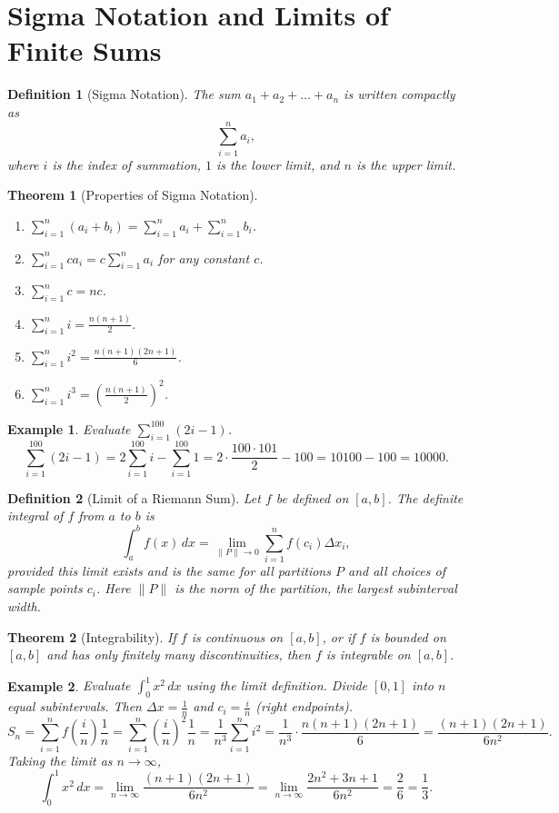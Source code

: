 \documentclass[11pt,a4paper]{article}
\newtheorem{example}{Example}
\newtheorem{theorem}{Theorem}
\newtheorem{definition}{Definition}
\begin{document}
\section{Sigma Notation and Limits of Finite Sums}
\begin{definition}[Sigma Notation]
The sum $a_1 + a_2 + \dots + a_n$ is written compactly as
\[
\sum_{i=1}^n a_i,
\]
where $i$ is the index of summation, $1$ is the lower limit, and $n$ is the upper limit.
\end{definition}
\begin{theorem}[Properties of Sigma Notation]
\begin{enumerate}
\item $\displaystyle \sum_{i=1}^n (a_i + b_i) = \sum_{i=1}^n a_i + \sum_{i=1}^n b_i$.
\item $\displaystyle \sum_{i=1}^n c a_i = c \sum_{i=1}^n a_i$ for any constant $c$.
\item $\displaystyle \sum_{i=1}^n c = n c$.
\item $\displaystyle \sum_{i=1}^n i = \frac{n(n+1)}{2}$.
\item $\displaystyle \sum_{i=1}^n i^2 = \frac{n(n+1)(2n+1)}{6}$.
\item $\displaystyle \sum_{i=1}^n i^3 = \left( \frac{n(n+1)}{2} \right)^2$.
\end{enumerate}
\end{theorem}
\begin{example}
Evaluate $\displaystyle \sum_{i=1}^{100} (2i - 1)$.
\[
\sum_{i=1}^{100} (2i - 1) = 2 \sum_{i=1}^{100} i - \sum_{i=1}^{100} 1 = 2 \cdot \frac{100 \cdot 101}{2} - 100 = 10100 - 100 = 10000.
\]
\end{example}
\begin{definition}[Limit of a Riemann Sum]
Let $f$ be defined on $[a, b]$. The \textit{definite integral} of $f$ from $a$ to $b$ is
\[
\int_a^b f(x) \, dx = \lim_{\|P\| \to 0} \sum_{i=1}^n f(c_i) \Delta x_i,
\]
provided this limit exists and is the same for all partitions $P$ and all choices of sample points $c_i$. Here $\|P\|$ is the norm of the partition, the largest subinterval width.
\end{definition}
\begin{theorem}[Integrability]
If $f$ is continuous on $[a, b]$, or if $f$ is bounded on $[a, b]$ and has only finitely many discontinuities, then $f$ is integrable on $[a, b]$.
\end{theorem}
\begin{example}
Evaluate $\displaystyle \int_0^1 x^2 \, dx$ using the limit definition.
Divide $[0, 1]$ into $n$ equal subintervals. Then $\Delta x = \frac{1}{n}$ and $c_i = \frac{i}{n}$ (right endpoints).
\[
S_n = \sum_{i=1}^n f\left( \frac{i}{n} \right) \frac{1}{n} = \sum_{i=1}^n \left( \frac{i}{n} \right)^2 \frac{1}{n} = \frac{1}{n^3} \sum_{i=1}^n i^2 = \frac{1}{n^3} \cdot \frac{n(n+1)(2n+1)}{6} = \frac{(n+1)(2n+1)}{6n^2}.
\]
Taking the limit as $n \to \infty$,
\[
\int_0^1 x^2 \, dx = \lim_{n \to \infty} \frac{(n+1)(2n+1)}{6n^2} = \lim_{n \to \infty} \frac{2n^2 + 3n + 1}{6n^2} = \frac{2}{6} = \frac{1}{3}.
\]
\end{example}
\end{document}
